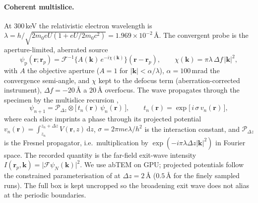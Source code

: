 \paragraph{Coherent multislice.}
At $300$\,keV the relativistic electron wavelength is
$\lambda = h/\sqrt{2m_0 eU(1+eU/2m_0c^2)} = 1.969\times10^{-2}\,$\AA. The convergent probe is
the aperture-limited, aberrated source
\begin{equation}
  \psi_{\mathrm{p}}(\mathbf{r};\mathbf{r}_p)
  = \mathcal{F}^{-1}\!\big\{A(\mathbf{k})\,e^{-i\chi(\mathbf{k})}\big\}(\mathbf{r}-\mathbf{r}_p),
  \qquad \chi(\mathbf{k}) = \pi\lambda\,\Delta f\,\lvert\mathbf{k}\rvert^2,
  \label{eq:probe}
\end{equation}
with $A$ the objective aperture ($A=1$ for $\lvert\mathbf{k}\rvert<\alpha/\lambda$), $\alpha=100$\,mrad
the convergence semi-angle, and $\chi$ kept to the defocus term (aberration-corrected
instrument), $\Delta f=-20$\,\AA{} a $20$\,\AA{} overfocus. The wave propagates through the
specimen by the multislice recursion \citep{CowleyMoodie1957,Kirkland2010},
\begin{equation}
  \psi_{n+1} = \mathcal{P}_{\Delta z}\!\otimes\!\big[\,t_n(\mathbf{r})\,\psi_n(\mathbf{r})\,\big],
  \qquad t_n(\mathbf{r}) = \exp\!\big[\,i\,\sigma\, v_n(\mathbf{r})\,\big],
  \label{eq:multislice}
\end{equation}
where each slice imprints a phase through its projected potential
$v_n(\mathbf{r})=\int_{z_n}^{z_n+\Delta z}V(\mathbf{r},z)\,\mathrm{d}z$, $\sigma=2\pi m e\lambda/h^2$
is the interaction constant, and $\mathcal{P}_{\Delta z}$ is the Fresnel propagator, i.e.\
multiplication by $\exp(-i\pi\lambda\Delta z\lvert\mathbf{k}\rvert^2)$ in Fourier space. The
recorded quantity is the far-field exit-wave intensity
$I(\mathbf{r}_p,\mathbf{k})=\lvert\mathcal{F}\psi_N(\mathbf{k})\rvert^2$. We use abTEM
\citep{MadsenSusi2021} on GPU; projected potentials follow the constrained parameterisation
of \citet{LobatoVanDyck2014} at $\Delta z=2$\,\AA{} ($0.5$\,\AA{} for the finely sampled
runs). The full box is kept uncropped so the broadening exit wave does not alias at the
periodic boundaries.

